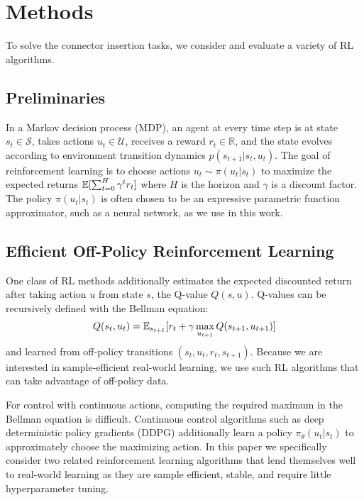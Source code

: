 \section{Methods}\label{sec:method}

To solve the connector insertion tasks, we consider and evaluate a variety of RL algorithms.

\subsection{Preliminaries}\label{sec:background}
In a Markov decision process (MDP), an agent at every time step is at state $s_t \in \mathcal{S}$, takes actions $u_t \in \mathcal{U}$, receives a reward $r_t \in \mathbb{R}$, and the state evolves according to environment transition dynamics $p(s_{t+1}|s_t, u_t)$. The goal of reinforcement learning is to choose actions $u_t \sim \pi(u_t|s_t)$ to maximize the expected returns $\operatorname{\mathbb{E}}[\sum_{t=0}^H \gamma^t r_t]$ where $H$ is the horizon and $\gamma$ is a discount factor. The policy $\pi(u_t|s_t)$ is often chosen to be an expressive parametric function approximator, such as a neural network, as we use in this work.


\subsection{Efficient Off-Policy Reinforcement Learning}
One class of RL methods additionally estimates the expected discounted return after taking action $u$ from state $s$, the {Q-value} $Q(s, u)$. Q-values can be recursively defined with the Bellman equation:
\begin{align}
    Q(s_t, u_t) = \operatorname{\mathbb{E}}_{s_{t+1}}[r_t + \gamma \max_{u_{t+1}} Q(s_{t+1}, u_{t+1})]
\end{align}
and learned from off-policy transitions $(s_t, u_t, r_t, s_{t+1})$. Because we are interested in sample-efficient real-world learning, we use such RL algorithms that can take advantage of off-policy data.

For control with continuous actions, computing the required maximum in the Bellman equation is difficult. Continuous control algorithms such as deep deterministic policy gradients (DDPG) \cite{lillicrap2015continuous} additionally learn a policy $\pi_\theta(u_t|s_t)$ to approximately choose the maximizing action. In this paper we specifically consider two related reinforcement learning algorithms that lend themselves well to real-world learning as they are sample efficient, stable, and require little hyperparameter tuning.

